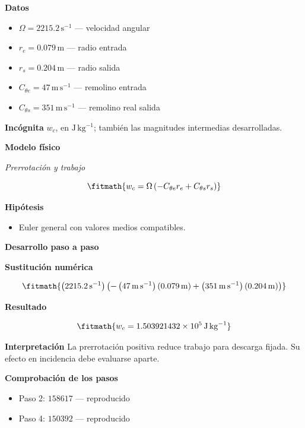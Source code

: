 \documentclass[10pt,openany]{book}
\begin{document}
\noindent\textbf{Datos}
\begin{itemize}
\item $\Omega = 2215.2\,\mathrm{s}^{-1}$ — velocidad angular
\item $r_e = 0.079\,\mathrm{m}$ — radio entrada
\item $r_s = 0.204\,\mathrm{m}$ — radio salida
\item $C_{\theta e} = 47\,\mathrm{m}\,\mathrm{s}^{-1}$ — remolino entrada
\item $C_{\theta s} = 351\,\mathrm{m}\,\mathrm{s}^{-1}$ — remolino real salida
\end{itemize}

\noindent\textbf{Incógnita}
$w_c$, en $\mathrm{J\,kg^{-1}}$; también las magnitudes intermedias desarrolladas.

\noindent\textbf{Modelo físico}

\noindent\textit{Prerrotación y trabajo}

\[
\fitmath{w_c=\Omega \left(- C_{\theta e} r_e + C_{\theta s} r_s\right)}
\]

\noindent\textbf{Hipótesis}
\begin{itemize}
\item Euler general con valores medios compatibles.
\end{itemize}

\noindent\textbf{Desarrollo paso a paso}



\noindent\textbf{Sustitución numérica}

\[
\fitmath{\left(2215.2\,\mathrm{s}^{-1}\right) \left(- \left(47\,\mathrm{m}\,\mathrm{s}^{-1}\right) \left(0.079\,\mathrm{m}\right) + \left(351\,\mathrm{m}\,\mathrm{s}^{-1}\right) \left(0.204\,\mathrm{m}\right)\right)}
\]

\noindent\textbf{Resultado}

\[
\fitmath{w_c=1.503921432\times10^{5}\,\mathrm{J}\,\mathrm{kg}^{-1}}
\]

\noindent\textbf{Interpretación}
La prerrotación positiva reduce trabajo para descarga fijada. Su efecto en incidencia debe evaluarse aparte.

\noindent\textbf{Comprobación de los pasos}
\begin{itemize}
\item Paso 2: $158617$ — reproducido
\item Paso 4: $150392$ — reproducido
\end{itemize}
\end{document}
